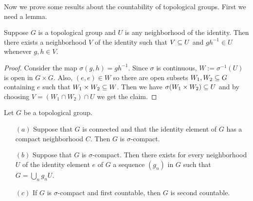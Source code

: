 Now we prove some results about the countability of topological groups. First we need a lemma.
\begin{lemma}\label{topo group identity nbhd lem}
Suppose $G$ is a topological group and $U$ is any neighborhood of the identity. Then there exists a neighborhood $V$ of the identity such that $V\subseteq U$ and $gh^{-1}\in U$ whenever $g,h\in V$.
\end{lemma}
\begin{proof}
Consider the map $\sigma(g,h)=gh^{-1}$. Since $\sigma$ is continuous, $W:=\sigma^{-1}(U)$ is open in $G\times G$. Also, $(e,e)\in W$ so there are open subsets $W_1,W_2\subseteq G$ containing $e$ such that $W_1\times W_2\subseteq W$. Then we have $\sigma(W_1\times W_2)\subseteq U$ and by choosing $V=(W_1\cap W_2)\cap U$ we get the claim.
\end{proof}
\begin{proposition}\label{topo group sigma compact}
Let $G$ be a topological group.
\begin{itemize}
\item[$(a)$] Suppose that $G$ is connected and that the identity element of $G$ has a compact neighborhood $C$. Then $G$ is $\sigma$-compact.
\item[$(b)$] Suppose that $G$ is $\sigma$-compact. Then there exists for every neighborhood $U$ of the identity element $e$ of $G$ a sequence $(g_n)$ in $G$ such that $G=\bigcup_ng_nU$.
\item[$(c)$] If $G$ is $\sigma$-compact and first countable, then $G$ is second countable.
\end{itemize}
\end{proposition}
